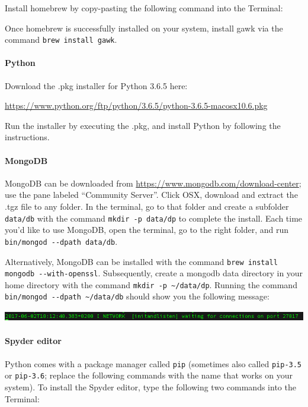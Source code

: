 \documentclass[a4paper]{report}
\begin{document}
Install homebrew by copy-pasting the following command into the
Terminal:



Once homebrew is successfully installed on your system, install gawk via
the command {\small\texttt{brew install gawk}}.

\paragraph{Python}
Download the .pkg installer for Python 3.6.5 here:

\url{https://www.python.org/ftp/python/3.6.5/python-3.6.5-macosx10.6.pkg}

Run the installer by executing the .pkg, and install Python by following
the instructions.

\paragraph{MongoDB}
MongoDB can be downloaded from
\url{https://www.mongodb.com/download-center}; use the pane labeled
``Community Server''. Click OSX, download and
extract the .tgz file to any folder. In the terminal, go to that folder
and create a subfolder {\small\texttt{data/db}} with the command {\small\texttt{mkdir
-p data/dp}} to complete the install. Each time you{\textquoteright}d
like to use MongoDB, open the terminal, go to the right folder, and run
{\small\texttt{bin/mongod -{}-dpath data/db}}.

Alternatively, MongoDB can be installed with the command {\small\texttt{brew
install mongodb -{}-with-openssl}}. Subsequently, create a mongodb data
directory in your home directory with the command {\small\texttt{mkdir -p
\~{}/data/dp}}. Running the command {\small\texttt{bin/mongod -{}-dpath
\~{}/data/db}} should show you the following message:

\noindent\includegraphics[width=6.4953in,height=0.1783in]{Syllabus-img6.png} 

\paragraph{Spyder editor}
Python comes with a package manager called {\small\texttt{pip}} (sometimes also
called {\small\texttt{pip-3.5}} or {\small\texttt{pip-3.6}}; replace the following commands with
the name that works on your system). To install the Spyder editor,
type the following two commands into the Terminal: 
\end{document}

